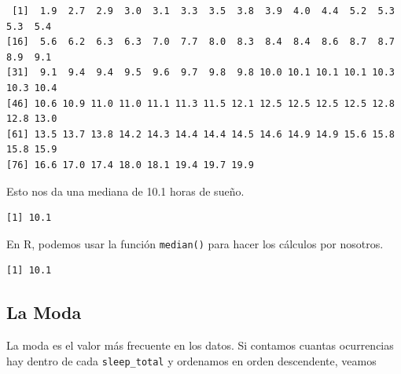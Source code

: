 \documentclass[
  letterpaper,
  DIV=11,
  numbers=noendperiod]{scrreprt}
\newenvironment{Shaded}{\begin{snugshade}}{\end{snugshade}}
\newcommand{\DecValTok}[1]{\textcolor[rgb]{0.68,0.00,0.00}{#1}}
\newcommand{\FunctionTok}[1]{\textcolor[rgb]{0.28,0.35,0.67}{#1}}
\newcommand{\NormalTok}[1]{\textcolor[rgb]{0.00,0.23,0.31}{#1}}
\newcommand{\SpecialCharTok}[1]{\textcolor[rgb]{0.37,0.37,0.37}{#1}}
\begin{document}
\begin{Shaded}
\end{Shaded}

\begin{verbatim}
 [1]  1.9  2.7  2.9  3.0  3.1  3.3  3.5  3.8  3.9  4.0  4.4  5.2  5.3  5.3  5.4
[16]  5.6  6.2  6.3  6.3  7.0  7.7  8.0  8.3  8.4  8.4  8.6  8.7  8.7  8.9  9.1
[31]  9.1  9.4  9.4  9.5  9.6  9.7  9.8  9.8 10.0 10.1 10.1 10.1 10.3 10.3 10.4
[46] 10.6 10.9 11.0 11.0 11.1 11.3 11.5 12.1 12.5 12.5 12.5 12.5 12.8 12.8 13.0
[61] 13.5 13.7 13.8 14.2 14.3 14.4 14.4 14.5 14.6 14.9 14.9 15.6 15.8 15.8 15.9
[76] 16.6 17.0 17.4 18.0 18.1 19.4 19.7 19.9
\end{verbatim}

Esto nos da una mediana de 10.1 horas de sueño.

\begin{Shaded}
\end{Shaded}

\begin{verbatim}
[1] 10.1
\end{verbatim}

En R, podemos usar la función \texttt{median()} para hacer los cálculos
por nosotros.

\begin{Shaded}
\end{Shaded}

\begin{verbatim}
[1] 10.1
\end{verbatim}

\hypertarget{la-moda}{%
\subsection{La Moda}\label{la-moda}}

La moda es el valor más frecuente en los datos. Si contamos cuantas
ocurrencias hay dentro de cada \texttt{sleep\_total} y ordenamos en
orden descendente, veamos
\end{document}
